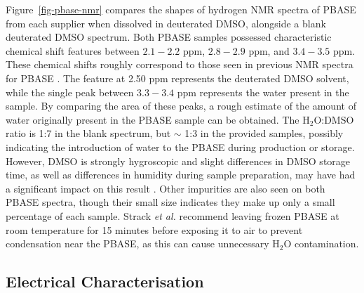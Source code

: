 \documentclass[
  a4paper,
]{scrbook}
\begin{document}
Figure~\ref{fig-pbase-nmr} compares the shapes of hydrogen NMR spectra
of PBASE from each supplier when dissolved in deuterated DMSO, alongside
a blank deuterated DMSO spectrum. Both PBASE samples possessed
characteristic chemical shift features between \(2.1-2.2\) ppm,
\(2.8-2.9\) ppm, and \(3.4-3.5\) ppm. These chemical shifts roughly
correspond to those seen in previous NMR spectra for PBASE
\autocite{NMR2}. The feature at 2.50 ppm represents the deuterated DMSO
solvent, while the single peak between \(3.3-3.4\) ppm represents the
water present in the sample. By comparing the area of these peaks, a
rough estimate of the amount of water originally present in the PBASE
sample can be obtained. The H\(_{2}\)O:DMSO ratio is 1:7 in the blank
spectrum, but \(\sim\) 1:3 in the provided samples, possibly indicating
the introduction of water to the PBASE during production or storage.
However, DMSO is strongly hygroscopic and slight differences in DMSO
storage time, as well as differences in humidity during sample
preparation, may have had a significant impact on this result
\autocite{Lebel1962}. Other impurities are also seen on both PBASE
spectra, though their small size indicates they make up only a small
percentage of each sample. Strack \emph{et al.} \autocite{Strack2013}
recommend leaving frozen PBASE at room temperature for 15 minutes before
exposing it to air to prevent condensation near the PBASE, as this can
cause unnecessary H\(_2\)O contamination.

\hypertarget{sec-PBASE-electrical-characterisation}{%
\subsection{Electrical
Characterisation}\label{sec-PBASE-electrical-characterisation}}
\end{document}
